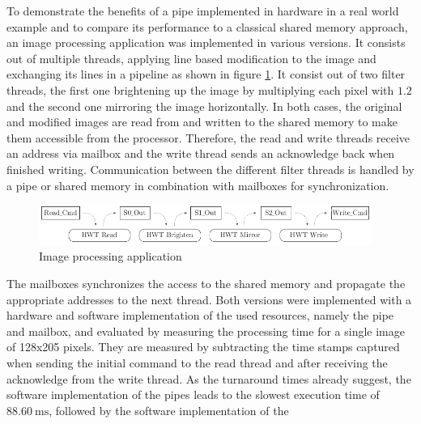 To demonstrate the benefits of a pipe implemented in hardware in a real world
example and to compare its performance to a classical shared memory approach,
an image processing application was implemented in various versions. It
consists out of multiple threads, applying line based modification to the
image and exchanging its lines in a pipeline as shown in figure
\ref{fig:img_proc}. It consist out of two filter threads, the first one
brightening up the image by multiplying each pixel with $1.2$ and the second
one mirroring the image horizontally. In both cases, the original and modified
images are read from and written to the shared memory to make them accessible
from the processor. Therefore, the read and write threads receive an address
via mailbox and the write thread sends an acknowledge back when finished
writing. Communication between the different filter threads is handled by a
pipe or shared memory in combination with mailboxes for synchronization.
\begin{figure}
	\centering
	\includegraphics[width=0.97\textwidth]{../figures/img_proc}
	\caption{Image processing application}
	\label{fig:img_proc}
\end{figure}
The mailboxes synchronizes the access to the shared memory and propagate the
appropriate addresses to the next thread. Both versions were implemented with
a hardware and software implementation of the used resources, namely the pipe
and mailbox, and evaluated by measuring the processing time for a single image
of 128x205 pixels. They are measured by subtracting the time stamps captured
when sending the initial command to the read thread and after receiving the
acknowledge from the write thread. As the turnaround times already suggest,
the software implementation of the pipes leads to the slowest execution time
of $\SI{88.60}{\milli\second}$, followed by the software implementation of the
